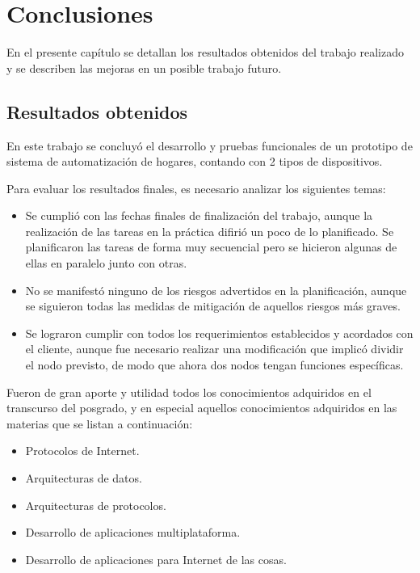 \chapter{Conclusiones}

\label{Chapter5}

En el presente capítulo se detallan los resultados obtenidos del trabajo realizado y se describen las mejoras en un posible trabajo futuro.

\section{Resultados obtenidos}

En este trabajo se concluyó el desarrollo y pruebas funcionales de un prototipo de sistema de automatización de hogares, contando con 2 tipos de dispositivos.

Para evaluar los resultados finales, es necesario analizar los siguientes temas:

\begin{itemize}
	\item Se cumplió con las fechas finales de finalización del trabajo, aunque la realización de las tareas en la práctica difirió un poco de lo planificado. Se planificaron las tareas de forma muy secuencial pero se hicieron algunas de ellas en paralelo junto con otras.
	\item No se manifestó ninguno de los riesgos advertidos en la planificación, aunque se siguieron todas las medidas de mitigación de aquellos riesgos más graves.
	\item Se lograron cumplir con todos los requerimientos establecidos y acordados con el cliente, aunque fue necesario realizar una modificación que implicó dividir el nodo previsto, de modo que ahora dos nodos tengan funciones específicas.
\end{itemize}

Fueron de gran aporte y utilidad todos los conocimientos adquiridos en el transcurso del posgrado, y en especial aquellos conocimientos adquiridos en las materias que se listan a continuación:

\begin{itemize}
	\item Protocolos de Internet.
	\item Arquitecturas de datos.
	\item Arquitecturas de protocolos.
	\item Desarrollo de aplicaciones multiplataforma.
	\item Desarrollo de aplicaciones para Internet de las cosas.
\end{itemize}


